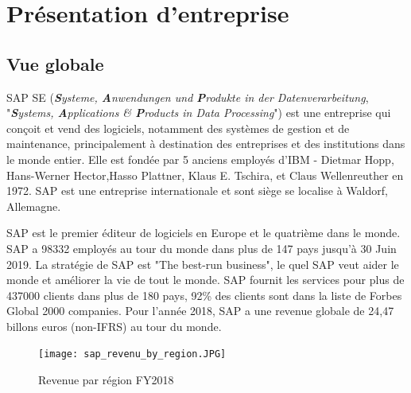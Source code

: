 
\section{Présentation d'entreprise}

\subsection{Vue globale}
    \par SAP SE (\textit{\textbf{S}ysteme, \textbf{A}nwendungen und \textbf{P}rodukte in der Datenverarbeitung}, "\textit{\textbf{S}ystems, \textbf{A}pplications \& \textbf{P}roducts in Data Processing}") est une entreprise qui conçoit et vend des logiciels, notamment des systèmes de gestion et de maintenance, principalement à destination des entreprises et des institutions dans le monde entier. Elle est fondée par 5 anciens employés d’IBM - Dietmar Hopp, Hans-Werner Hector,Hasso Plattner, Klaus E. Tschira, et Claus Wellenreuther en 1972. SAP est une entreprise internationale et sont siège se localise à Waldorf, Allemagne.
    
    \par \cite{SAP_Corporate_Fact_Sheet} SAP est le premier éditeur de logiciels en Europe et le quatrième dans le monde. SAP a 98332 employés au tour du monde dans plus de 147 pays jusqu'à 30 Juin 2019. La stratégie de SAP est "The best-run business", le quel SAP veut aider le monde et améliorer la vie de tout le monde. SAP fournit les services pour plus de 437000 clients dans plus de 180 pays, 92\% des clients sont dans la liste de Forbes Global 2000 companies. Pour l'année 2018, SAP a une revenue globale de 24,47 billons euros (non-IFRS) au tour du monde.
    \begin{figure}[H]
        \flushleft
        \texttt{[image: sap\_revenu\_by\_region.JPG]}
        \caption{Revenue par région FY2018}
        \label{fig:revenue_by_region2018_label}
    \end{figure}
    

